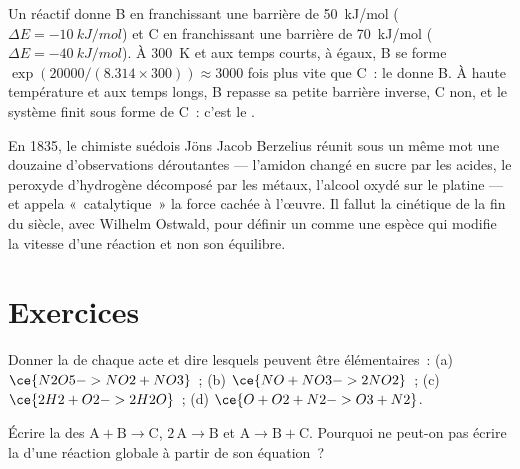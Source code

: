 \begin{example}\label{ex:b1:elementary-steps:control}
Un réactif donne B en franchissant une barrière de \qty{50}{kJ/mol}
($\Delta E =
\qty{-10}{kJ/mol}$) et C en franchissant une barrière de
\qty{70}{kJ/mol} ($\Delta E =
\qty{-40}{kJ/mol}$). À \qty{300}{K} et aux temps courts, à  égaux, B se forme $\exp(20000/(8.314 \times 300)) \approx
3000$ fois plus vite que C~: le  donne B. À haute
température et aux temps longs, B repasse sa petite barrière inverse, C
non, et le système finit sous forme de C~: c'est le .
\end{example}

\begin{history}[La catalyse, 1835]
En 1835, le chimiste suédois Jöns Jacob Berzelius réunit sous un même mot
une douzaine d'observations déroutantes --- l'amidon changé en sucre par
les acides, le peroxyde d'hydrogène décomposé par les métaux, l'alcool
oxydé sur le platine --- et appela «~catalytique~» la force cachée à
l'œuvre. Il fallut la cinétique de la fin du siècle, avec Wilhelm
Ostwald, pour définir un  comme une espèce qui modifie la
vitesse d'une réaction et non son équilibre.
\end{history}

\section{Exercices}

\begin{exercise}[$\star$]\label{exo:b1:elementary-steps:1}
Donner la  de chaque acte et dire lesquels peuvent être élémentaires~:
(a) $\ce{N2O5 -> NO2 + NO3}$~; (b) $\ce{NO + NO3 -> 2NO2}$~;
(c) $\ce{2H2 + O2 -> 2H2O}$~; (d) $\ce{O + O2 + N2 -> O3 + N2}$.
\end{exercise}

\begin{exercise}[$\star$]\label{exo:b1:elementary-steps:2}
Écrire la  des  $\mathrm{A} + \mathrm{B} \to
\mathrm{C}$, $2\,\mathrm{A} \to \mathrm{B}$ et $\mathrm{A} \to \mathrm{B} +
\mathrm{C}$. Pourquoi ne peut-on pas écrire la  d'une
réaction globale à partir de son équation~?
\end{exercise}

